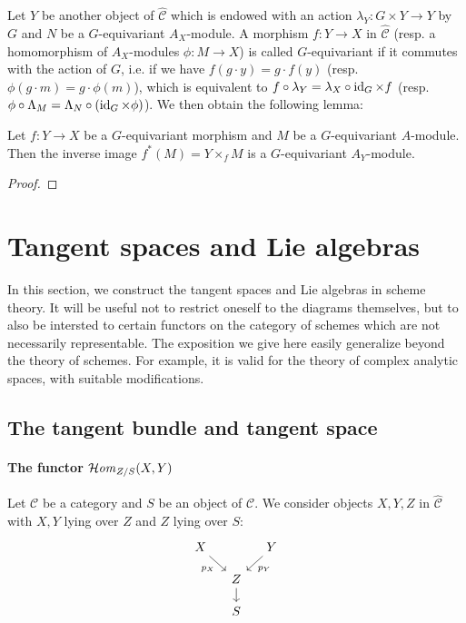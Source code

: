 Let $Y$ be another object of $\widehat{\mathcal{C}}$ which is endowed with an action $\lambda_Y:G\times Y\to Y$ by $G$ and $N$ be a $G$-equivariant $A_X$-module. A morphism $f:Y\to X$ in $\widehat{\mathcal{C}}$ (resp. a homomorphism of $A_X$-modules $\phi:M\to X$) is called $G$-equivariant if it commutes with the action of $G$, i.e. if we have $f(g\cdot y)=g\cdot f(y)$ (resp. $\phi(g\cdot m)=g\cdot\phi(m)$), which is equivalent to $f\circ\lambda_Y=\lambda_X\circ\operatorname{id}_G\times f$ (resp. $\phi\circ\Lambda_M=\Lambda_N\circ(\operatorname{id}_G\times\phi)$). We then obtain the following lemma:

\begin{lemma}\label{category of presheaf G-equivariant pullback}
Let $f:Y\to X$ be a $G$-equivariant morphism and $M$ be a $G$-equivariant $A$-module. Then the inverse image $f^*(M)=Y\times_fM$ is a $G$-equivariant $A_Y$-module.
\end{lemma}
\begin{proof}

\end{proof}

\section{Tangent spaces and Lie algebras}
In this section, we construct the tangent spaces and Lie algebras in scheme theory. It will be useful not to restrict oneself to the diagrams themselves, but to also be intersted to certain functors on the category of schemes which are not necessarily representable. The exposition we give here easily generalize beyond the theory of schemes. For example, it is valid for the theory of complex analytic spaces, with suitable modifications.
\subsection{The tangent bundle and tangent space}
\paragraph{The functor \texorpdfstring{$\operatorname{\mathcal{H}\hspace*{-0.4pt}\textit{om}\hspace{0.5pt}}_{Z/S}(X,Y)$}{Hom}}\label{scheme tangent bundle functor sHom_Z/S(X,Y) paragraph}
Let $\mathcal{C}$ be a category and $S$ be an object of $\mathcal{C}$. We consider objects $X,Y,Z$ in $\widehat{\mathcal{C}}$ with $X,Y$ lying over $Z$ and $Z$ lying over $S$:
\[\begin{tikzcd}[row sep=4mm, column sep=4mm]
X\ar[rd,swap,"p_X"]&&Y\ar[ld,"p_Y"]\\
&Z\ar[d]&\\
&S
\end{tikzcd}\]

